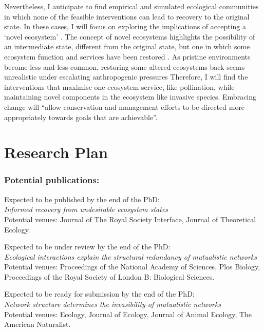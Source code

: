 \documentclass[a4paper]{article}
\begin{document}
Nevertheless, I anticipate to find empirical and simulated ecological communities in which none of the feasible interventions can lead to recovery to the original state.
In these cases, I will focus on exploring the implications of accepting a `novel ecosystem' \autocite{Hobbs2006}.
The concept of novel ecosystems highlights the possibility of an intermediate state, different from the original state, but one in which some ecosystem function and services have been restored \autocite{Graham2014a, Graham2015a}.
As pristine environments become less and less common, restoring some altered ecosystems back seems unrealistic under escalating anthropogenic pressures \autocite{Graham2015a}
Therefore, I will find the interventions that maximise one ecosystem service, like pollination, while maintaining novel components in the ecosystem like invasive species.
Embracing change will ``allow conservation and management efforts to be directed more appropriately towards goals that are achievable''\autocite{Graham2014a}.

\section*{Research Plan}

\subsubsection*{Potential publications:}
Expected to be published by the end of the PhD: \\
\emph{Informed recovery from undesirable ecosystem states} \hfill \\
Potential venues: Journal of The Royal Society Interface, Journal of Theoretical Ecology.

\noindent
Expected to be under review by the end of the PhD: \\
\emph{Ecological interactions explain the structural redundancy of mutualistic networks} \hfill \\
Potential venues: Proceedings of the National Academy of Sciences, Plos Biology, Proceedings of the Royal Society of London B: Biological Sciences.

\noindent
Expected to be ready for submission by the end of the PhD: \\
\emph{Network structure determines the invasibility of mutualistic networks} \hfill \\
Potential venues: Ecology, Journal of Ecology, Journal of Animal Ecology, The American Naturalist.
\end{document}

